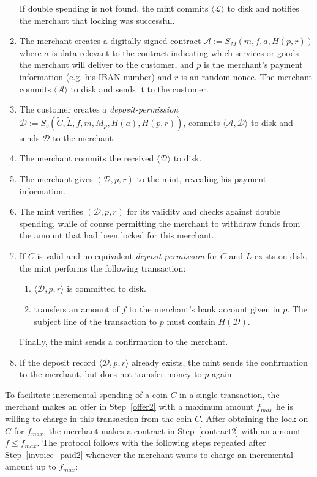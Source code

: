\documentclass{llncs}
\begin{document}
\begin{enumerate}
  If double spending is not found, 
  the mint commits $\langle \mathcal{L} \rangle$ to disk
  and notifies the merchant that locking was successful.
\item\label{contract2} The merchant creates a digitally signed contract
  $\mathcal{A} := S_M(m, f, a, H(p, r))$ where $a$ is data relevant to the contract
  indicating which services or goods the merchant will deliver to the customer, and $p$ is the
  merchant's payment information (e.g. his IBAN number) and $r$ is an random nonce.
  The merchant commits $\langle \mathcal{A} \rangle$ to disk and sends it to the customer.
\item The customer creates a
  \emph{deposit-permission} $\mathcal{D} := S_c(\widetilde{C}, \widetilde{L}, f, m, M_p, H(a), H(p, r))$, commits
  $\langle \mathcal{A}, \mathcal{D} \rangle$ to disk and sends $\mathcal{D}$ to the merchant.
\item\label{invoice_paid2} The merchant commits the received $\langle \mathcal{D} \rangle$ to disk.  
\item The merchant gives $(\mathcal{D}, p, r)$ to the mint, revealing his
  payment information.
\item The mint verifies $(\mathcal{D}, p, r)$ for its validity and
  checks against double spending, while of
  course permitting the merchant to withdraw funds from the amount that
  had been locked for this merchant.
 \item If $\widetilde{C}$ is valid and no equivalent \emph{deposit-permission} for $\widetilde{C}$ and $\widetilde{L}$ exists on disk, the
  mint performs the following transaction:
  \begin{enumerate}
    \item $\langle \mathcal{D}, p, r \rangle$ is committed to disk.
    \item\label{transfer2} transfers an amount of $f$ to the merchant's bank account
      given in $p$.  The subject line of the transaction to $p$ must contain
      $H(\mathcal{D})$.
  \end{enumerate}
  Finally, the mint sends a confirmation to the merchant.
 \item If the deposit record $\langle \mathcal{D}, p, r \rangle$ already exists,
  the mint sends the confirmation to the merchant, 
  but does not transfer money to $p$ again.
\end{enumerate}

To facilitate incremental spending of a coin $C$ in a single transaction, the
merchant makes an offer in Step~\ref{offer2} with a maximum amount $f_{max}$ he
is willing to charge in this transaction from the coin $C$.  After obtaining the
lock on $C$ for $f_{max}$, the merchant makes a contract in Step~\ref{contract2}
with an amount $f \leq f_{max}$.  The protocol follows with the following steps
repeated after Step~\ref{invoice_paid2} whenever the merchant wants to charge an
incremental amount up to $f_{max}$:
\end{document}
